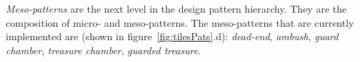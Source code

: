 \emph{Meso-patterns} are the next level in the design pattern hierarchy. They are the composition of micro- and meso-patterns. The meso-patterns that are currently implemented are (shown in figure~\ref{fig:tilesPats}.d): \emph{dead-end}, \emph{ambush}, \emph{guard chamber}, \emph{treasure chamber}, \emph{guarded treasure}.















